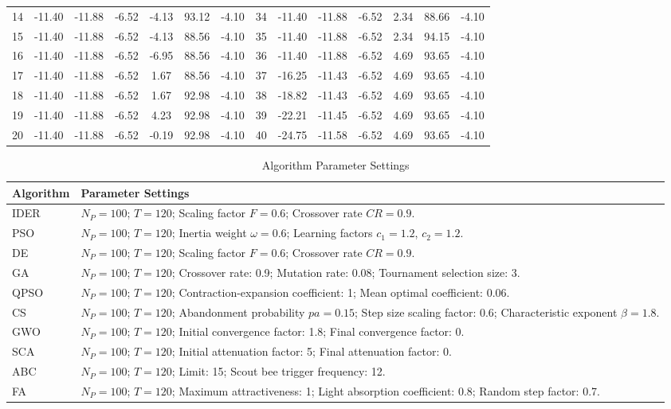 \documentclass[lettersize,onecolumn]{IEEEtran}
\begin{document}
\begin{table}[!htb]
\begin{tabular*}{\textwidth}{@{\extracolsep{\fill}}c cccccc|c cccccc}
		14 & -11.40 & -11.88 & -6.52 & -4.13 & 93.12 & -4.10 & 34 & -11.40 & -11.88 & -6.52 & 2.34  & 88.66 & -4.10 \\
		15 & -11.40 & -11.88 & -6.52 & -4.13 & 88.56 & -4.10 & 35 & -11.40 & -11.88 & -6.52 & 2.34  & 94.15 & -4.10 \\
		16 & -11.40 & -11.88 & -6.52 & -6.95 & 88.56 & -4.10 & 36 & -11.40 & -11.88 & -6.52 & 4.69  & 93.65 & -4.10 \\
		17 & -11.40 & -11.88 & -6.52 & 1.67  & 88.56 & -4.10 & 37 & -16.25 & -11.43 & -6.52 & 4.69  & 93.65 & -4.10 \\
		18 & -11.40 & -11.88 & -6.52 & 1.67  & 92.98 & -4.10 & 38 & -18.82 & -11.43 & -6.52 & 4.69  & 93.65 & -4.10 \\
		19 & -11.40 & -11.88 & -6.52 & 4.23  & 92.98 & -4.10 & 39 & -22.21 & -11.45 & -6.52 & 4.69  & 93.65 & -4.10 \\
		20 & -11.40 & -11.88 & -6.52 & -0.19 & 92.98 & -4.10 & 40 & -24.75 & -11.58 & -6.52 & 4.69  & 93.65 & -4.10 \\
		\bottomrule
	\end{tabular*}
\end{table}
	
	\renewcommand{\thetable}{S.II}
\begin{table}[!htb]
	\caption{Algorithm Parameter Settings}
	\label{tab2}
	\centering
	\footnotesize
	\begin{tabular*}{\textwidth}{@{\extracolsep{\fill}}m{}p{}}
		\toprule
		Algorithm & Parameter Settings \\
		\midrule
		IDER & \(N_P = 100\); \(T = 120\); Scaling factor \(F = 0.6\); Crossover rate \(CR = 0.9\). \\
		PSO  & \(N_P = 100\); \(T = 120\); Inertia weight \(\omega = 0.6\); Learning factors \(c_1 = 1.2\), \(c_2 = 1.2\). \\
		DE   & \(N_P = 100\); \(T = 120\); Scaling factor \(F = 0.6\); Crossover rate \(CR = 0.9\). \\
		GA   & \(N_P = 100\); \(T = 120\); Crossover rate: 0.9; Mutation rate: 0.08; Tournament selection size: 3. \\
		QPSO & \(N_P = 100\); \(T = 120\); Contraction-expansion coefficient: 1; Mean optimal coefficient: 0.06. \\
		CS   & \(N_P = 100\); \(T = 120\); Abandonment probability \(pa = 0.15\); Step size scaling factor: 0.6; Characteristic exponent \(\beta = 1.8\). \\
		GWO  & \(N_P = 100\); \(T = 120\); Initial convergence factor: 1.8; Final convergence factor: 0. \\
		SCA  & \(N_P = 100\); \(T = 120\); Initial attenuation factor: 5; Final attenuation factor: 0. \\
		ABC  & \(N_P = 100\); \(T = 120\); Limit: 15; Scout bee trigger frequency: 12. \\
		FA   & \(N_P = 100\); \(T = 120\); Maximum attractiveness: 1; Light absorption coefficient: 0.8; Random step factor: 0.7. \\
		\bottomrule
	\end{tabular*}
\end{table}
\end{document}
